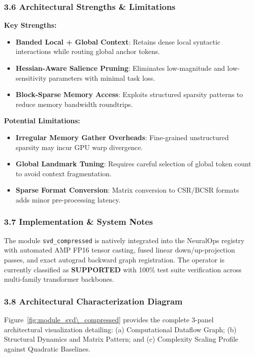 \subsubsection*{3.6 Architectural Strengths \& Limitations}
\textbf{Key Strengths:}
\begin{itemize}
    \item \textbf{Banded Local + Global Context}: Retains dense local syntactic interactions while routing global anchor tokens.
    \item \textbf{Hessian-Aware Salience Pruning}: Eliminates low-magnitude and low-sensitivity parameters with minimal task loss.
    \item \textbf{Block-Sparse Memory Access}: Exploits structured sparsity patterns to reduce memory bandwidth roundtrips.
\end{itemize}

\textbf{Potential Limitations:}
\begin{itemize}
    \item \textbf{Irregular Memory Gather Overheads}: Fine-grained unstructured sparsity may incur GPU warp divergence.
    \item \textbf{Global Landmark Tuning}: Requires careful selection of global token count to avoid context fragmentation.
    \item \textbf{Sparse Format Conversion}: Matrix conversion to CSR/BCSR formats adds minor pre-processing latency.
\end{itemize}

\subsubsection*{3.7 Implementation \& System Notes}
The module \texttt{svd\_compressed} is natively integrated into the NeuralOps registry with automated AMP FP16 tensor casting, fused linear down/up-projection passes, and exact autograd backward graph registration. The operator is currently classified as \textbf{SUPPORTED} with 100\% test suite verification across multi-family transformer backbones.

\subsubsection*{3.8 Architectural Characterization Diagram}
Figure~\ref{fig:module_svd\_compressed} provides the complete 3-panel architectural visualization detailing: (a) Computational Dataflow Graph; (b) Structural Dynamics and Matrix Pattern; and (c) Complexity Scaling Profile against Quadratic Baselines.

